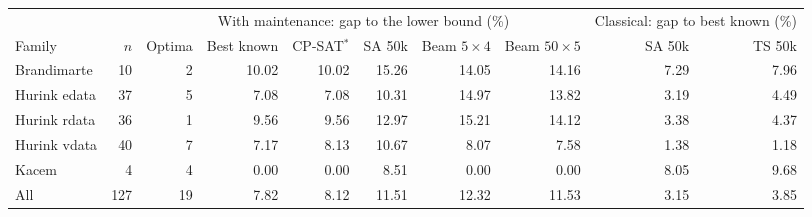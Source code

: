 \begin{tabular}{@{}lrrrrrrrrr@{}}
\toprule
 & & \multicolumn{6}{c}{With maintenance: gap to the lower bound (\%)} & \multicolumn{2}{c}{Classical: gap to best known (\%)} \\
\cmidrule(lr){3-8}\cmidrule(l){9-10}
Family & $n$ & Optima & Best known & CP-SAT$^{*}$ & SA 50k & Beam $5 \times 4$ & Beam $50 \times 5$ & SA 50k & TS 50k \\
\midrule
Brandimarte & 10 & 2 & 10.02 & 10.02 & 15.26 & 14.05 & 14.16 & 7.29 & 7.96 \\
Hurink edata & 37 & 5 & 7.08 & 7.08 & 10.31 & 14.97 & 13.82 & 3.19 & 4.49 \\
Hurink rdata & 36 & 1 & 9.56 & 9.56 & 12.97 & 15.21 & 14.12 & 3.38 & 4.37 \\
Hurink vdata & 40 & 7 & 7.17 & 8.13 & 10.67 & 8.07 & 7.58 & 1.38 & 1.18 \\
Kacem & 4 & 4 & 0.00 & 0.00 & 8.51 & 0.00 & 0.00 & 8.05 & 9.68 \\
\midrule
All & 127 & 19 & 7.82 & 8.12 & 11.51 & 12.32 & 11.53 & 3.15 & 3.85 \\
\bottomrule
\end{tabular}
